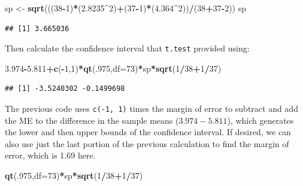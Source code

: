 \documentclass[]{book}
\newenvironment{Shaded}{\begin{snugshade}}{\end{snugshade}}
\newcommand{\KeywordTok}[1]{\textcolor[rgb]{0.13,0.29,0.53}{\textbf{#1}}}
\newcommand{\DataTypeTok}[1]{\textcolor[rgb]{0.13,0.29,0.53}{#1}}
\newcommand{\DecValTok}[1]{\textcolor[rgb]{0.00,0.00,0.81}{#1}}
\newcommand{\FloatTok}[1]{\textcolor[rgb]{0.00,0.00,0.81}{#1}}
\newcommand{\StringTok}[1]{\textcolor[rgb]{0.31,0.60,0.02}{#1}}
\newcommand{\OperatorTok}[1]{\textcolor[rgb]{0.81,0.36,0.00}{\textbf{#1}}}
\newcommand{\NormalTok}[1]{#1}
\begin{document}
\begin{Shaded}
\begin{Highlighting}[]
\NormalTok{sp <-}\StringTok{ }\KeywordTok{sqrt}\NormalTok{(((}\DecValTok{38}\OperatorTok{-}\DecValTok{1}\NormalTok{)}\OperatorTok{*}\NormalTok{(}\FloatTok{2.8235}\OperatorTok{^}\DecValTok{2}\NormalTok{)}\OperatorTok{+}\NormalTok{(}\DecValTok{37}\OperatorTok{-}\DecValTok{1}\NormalTok{)}\OperatorTok{*}\NormalTok{(}\FloatTok{4.364}\OperatorTok{^}\DecValTok{2}\NormalTok{))}\OperatorTok{/}\NormalTok{(}\DecValTok{38}\OperatorTok{+}\DecValTok{37}\OperatorTok{-}\DecValTok{2}\NormalTok{))}
\NormalTok{sp}
\end{Highlighting}
\end{Shaded}

\begin{verbatim}
## [1] 3.665036
\end{verbatim}

Then calculate the confidence interval that \texttt{t.test} provided
using:

\begin{Shaded}
\begin{Highlighting}[]
\FloatTok{3.974}\OperatorTok{-}\FloatTok{5.811}\OperatorTok{+}\KeywordTok{c}\NormalTok{(}\OperatorTok{-}\DecValTok{1}\NormalTok{,}\DecValTok{1}\NormalTok{)}\OperatorTok{*}\KeywordTok{qt}\NormalTok{(.}\DecValTok{975}\NormalTok{,}\DataTypeTok{df=}\DecValTok{73}\NormalTok{)}\OperatorTok{*}\NormalTok{sp}\OperatorTok{*}\KeywordTok{sqrt}\NormalTok{(}\DecValTok{1}\OperatorTok{/}\DecValTok{38}\OperatorTok{+}\DecValTok{1}\OperatorTok{/}\DecValTok{37}\NormalTok{)}
\end{Highlighting}
\end{Shaded}

\begin{verbatim}
## [1] -3.5240302 -0.1499698
\end{verbatim}

The previous code uses \texttt{c(-1,\ 1)} times the margin of error to
subtract and add the ME to the difference in the sample means
(\(3.974-5.811\)), which generates the lower and then upper bounds of
the confidence interval. If desired, we can also use just the last
portion of the previous calculation to find the margin of error, which
is 1.69 here.

\begin{Shaded}
\begin{Highlighting}[]
\KeywordTok{qt}\NormalTok{(.}\DecValTok{975}\NormalTok{,}\DataTypeTok{df=}\DecValTok{73}\NormalTok{)}\OperatorTok{*}\NormalTok{sp}\OperatorTok{*}\KeywordTok{sqrt}\NormalTok{(}\DecValTok{1}\OperatorTok{/}\DecValTok{38}\OperatorTok{+}\DecValTok{1}\OperatorTok{/}\DecValTok{37}\NormalTok{)}
\end{Highlighting}
\end{Shaded}
\end{document}

